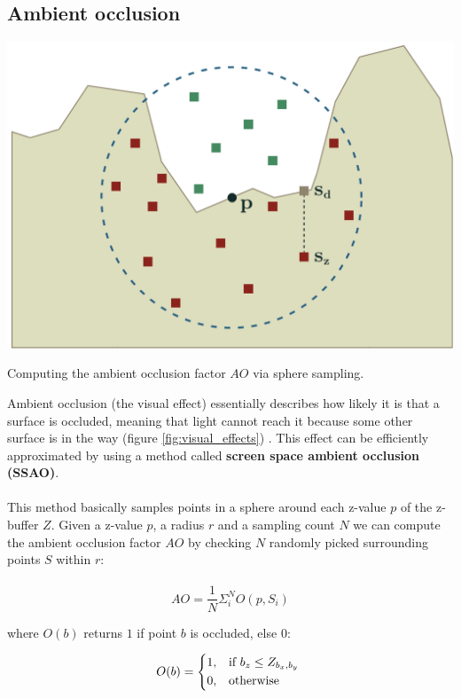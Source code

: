 \documentclass{ACGSeminar}
\begin{document}
	\subsection{Ambient occlusion}
		\begin{floatingfigure}[r]{.5\textwidth}%
			\includegraphics[width=.5\textwidth]{img/ao_sphere_sampling.png}%

			\caption{Computing the ambient occlusion factor $AO$ via sphere sampling.}%
			\label{fig:ao_sphere_sampling}%
		\end{floatingfigure}%


		Ambient occlusion (the visual effect) essentially describes how likely it is that a surface is occluded, meaning that light cannot reach it because some other surface is in the way (figure \ref{fig:visual_effects}) \cite{AOM}. This effect can be efficiently approximated by using a method called \textbf{screen space ambient occlusion (SSAO)}. \\\\
		
		This method basically samples points in a sphere around each z-value $p$ of the z-buffer $Z$. Given a z-value $p$, a radius $r$ and a sampling count $N$ we can compute the ambient occlusion factor $AO$ by checking $N$ randomly picked surrounding points $S$ within $r$:
		\\\\
		$$ AO = \frac{1}{N} \Sigma_{i}^{N} O(p, S_i) $$

		where $O(b)$ returns $1$ if point $b$ is occluded, else $0$:

		\[
			O(b) = 
			\begin{dcases*} 
			\text{1,} & if  $b_{z} \leq Z_{b_{x}, b_{y}}$ \\ 
			\text{0,} & otherwise 
			\end{dcases*} 
		\]
\end{document}
